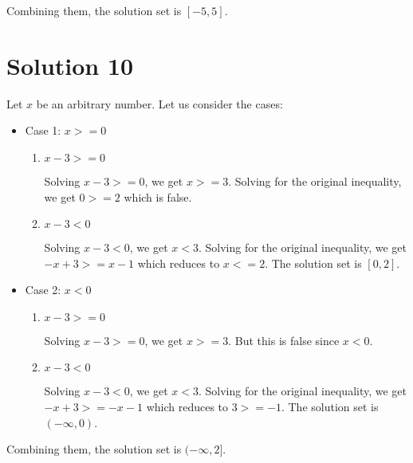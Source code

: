 \documentclass{article}
\begin{document}
Combining them, the solution set is $[-5, 5]$.

\section{Solution 10}

Let $x$ be an arbitrary number. Let us consider the cases:

\begin{itemize}
\item Case 1: $x >= 0$

  \begin{enumerate}
  \item $x - 3 >= 0$

    Solving $x - 3 >= 0$, we get $x >= 3$. Solving for the original
    inequality, we get $ 0 >= 2$ which is false.
    
  \item $x - 3 < 0$

    Solving $x - 3 < 0$, we get $x < 3$. Solving for the original
    inequality, we get $-x + 3 >= x - 1$ which reduces to $x <= 2$.
    The solution set is $[0, 2]$.
  \end{enumerate}

\item Case 2: $x < 0$

  \begin{enumerate}
  \item $x - 3 >= 0$

    Solving $x - 3 >= 0$, we get $x >= 3$. But this is false since
    $x < 0$.
    
  \item $x - 3 < 0$

    Solving $x - 3 < 0$, we get $x < 3$. Solving for the original
    inequality, we get $-x + 3 >= -x - 1$ which reduces to $3 >= -1$.
    The solution set is $(-\infty, 0)$.
  \end{enumerate}

\end{itemize}

Combining them, the solution set is $(-\infty, 2]$.
\end{document}
